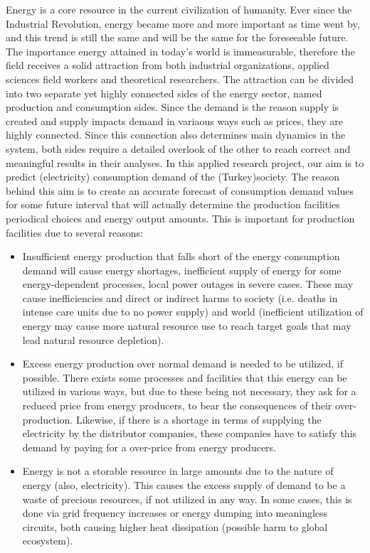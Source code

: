 \documentclass[11pt, a4paper, leqno]{article}
\begin{document}
Energy is a core resource in the current civilization of humanity. Ever since the Industrial Revolution, energy became more and more important as time went by, and this trend is still the same and will be the same for the foreseeable future. The importance energy attained in today’s world is immeasurable, therefore the field receives a solid attraction from both industrial organizations, applied sciences field workers and theoretical researchers.
The attraction can be divided into two separate yet highly connected sides of the energy sector, named production and consumption sides. Since the demand is the reason supply is created and supply impacts demand in variaous ways such as prices, they are highly connected. Since this connection also determines main dynamics in the system, both sides require a detailed overlook of the other to reach correct and meaningful results in their analyses.
In this applied research project, our aim is to predict (electricity) consumption demand of the (Turkey)society. The reason behind this aim is to create an accurate forecast of consumption demand values for some future interval that will actually determine the production facilities periodical choices and energy output amounts.
This is important for production facilities due to several reasons:

\begin{itemize}
    \item Insufficient energy production that falls short of the energy consumption demand will cause energy shortages, inefficient supply of energy for some energy-dependent processes, local power outages in severe cases. These may cause inefficiencies and direct or indirect harms to society (i.e. deaths in intense care units due to no power supply) and world (inefficient utilization of energy may cause more natural resource use to reach target goals that may lead natural resource depletion).
    \item Excess energy production over normal demand is needed to be utilized, if possible. There exists some processes and facilities that this energy can be utilized in various ways, but due to these being not necessary, they ask for a reduced price from energy producers, to bear the consequences of their over-production. Likewise, if there is a shortage in terms of supplying the electricity by the distributor companies, these companies have to satisfy this demand by paying for a over-price from energy producers.
    \item Energy is not a storable resource in large amounts due to the nature of energy (also, electricity). This causes the excess supply of demand to be a waste of precious resources, if not utilized in any way. In some cases, this is done via grid frequency increases or energy dumping into meaningless circuits, both causing higher heat dissipation (possible harm to global ecosystem).
\end{itemize}
\end{document}
